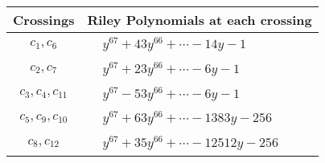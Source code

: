 \documentclass[1p]{elsarticle_modified}
\theoremstyle{definition}
\begin{document}
\begin{tabular}{m{50pt}|m{274pt}}
Crossings & \hspace{64pt}Riley Polynomials at each crossing \\
\hline $$\begin{aligned}c_{1},c_{6}\end{aligned}$$&$\begin{aligned}
&y^{67}+43 y^{66}+\cdots-14 y-1
\end{aligned}$\\
\hline $$\begin{aligned}c_{2},c_{7}\end{aligned}$$&$\begin{aligned}
&y^{67}+23 y^{66}+\cdots-6 y-1
\end{aligned}$\\
\hline $$\begin{aligned}c_{3},c_{4},c_{11}\end{aligned}$$&$\begin{aligned}
&y^{67}-53 y^{66}+\cdots-6 y-1
\end{aligned}$\\
\hline $$\begin{aligned}c_{5},c_{9},c_{10}\end{aligned}$$&$\begin{aligned}
&y^{67}+63 y^{66}+\cdots-1383 y-256
\end{aligned}$\\
\hline $$\begin{aligned}c_{8},c_{12}\end{aligned}$$&$\begin{aligned}
&y^{67}+35 y^{66}+\cdots-12512 y-256
\end{aligned}$\\
\hline
\end{tabular}
\vskip 2pc
\end{document}
